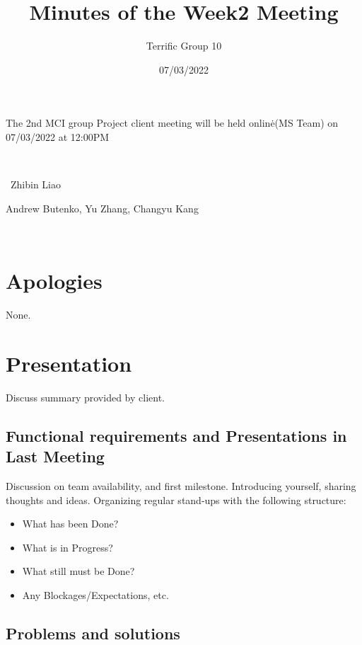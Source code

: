 \documentclass{article}
\newcommand{\tmtextbf}[1]{\text{{\bfseries{#1}}}}
\newenvironment{itemizedot}{\begin{itemize} \renewcommand{\labelitemi}{$\bullet$}\renewcommand{\labelitemii}{$\bullet$}\renewcommand{\labelitemiii}{$\bullet$}\renewcommand{\labelitemiv}{$\bullet$}}{\end{itemize}}
\begin{document}
\noindent The 2nd MCI group Project client meeting will be held online\.{}(MS Team) on 07/03/2022 at 12:00PM
\nopagebreak

\

\title{Minutes of the Week2 Meeting}
\author{Terrific Group 10}
\date{07/03/2022}
\pagestyle{empty}
{\let\newpage\relax\maketitle}

\noindent\tmtextbf{Chair:} \ Zhibin Liao

\noindent\tmtextbf{Members:} Andrew Butenko, Yu Zhang, Changyu Kang

\

\section{Apologies}

None.

\section{Presentation}

Discuss summary provided by client.

\subsection{Functional requirements and Presentations in Last Meeting}

Discussion on team availability, and first milestone. Introducing yourself,
sharing thoughts and ideas. Organizing regular stand-ups with the following structure:
\begin{itemizedot}
  \item What has been Done?
  
  \item What is in Progress?
  
  \item What still must be Done?
  
  \item Any Blockages/Expectations, etc.
\end{itemizedot}

\subsection{Problems and solutions}
\end{document}
